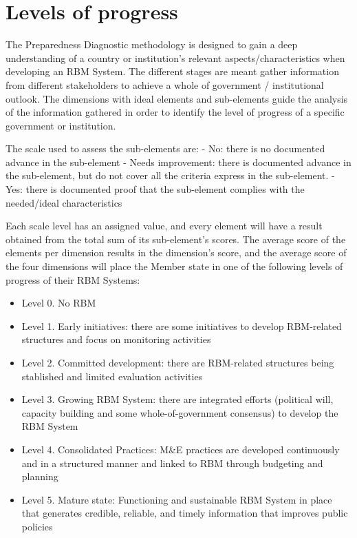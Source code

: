 \documentclass[
]{book}
\providecommand{\tightlist}{%
  \setlength{\itemsep}{0pt}\setlength{\parskip}{0pt}}
\begin{document}
\hypertarget{levels-of-progress}{%
\section{Levels of progress}\label{levels-of-progress}}

The Preparedness Diagnostic methodology is designed to gain a deep understanding of a country or institution's relevant aspects/characteristics when developing an RBM System. The different stages are meant gather information from different stakeholders to achieve a whole of government / institutional outlook. The dimensions with ideal elements and sub-elements guide the analysis of the information gathered in order to identify the level of progress of a specific government or institution.

The scale used to assess the sub-elements are:
- No: there is no documented advance in the sub-element
- Needs improvement: there is documented advance in the sub-element, but do not cover all the criteria express in the sub-element.
- Yes: there is documented proof that the sub-element complies with the needed/ideal characteristics

Each scale level has an assigned value, and every element will have a result obtained from the total sum of its sub-element's scores. The average score of the elements per dimension results in the dimension's score, and the average score of the four dimensions will place the Member state in one of the following levels of progress of their RBM Systems:

\begin{itemize}
\tightlist
\item
  Level 0. No RBM
\item
  Level 1. Early initiatives: there are some initiatives to develop RBM-related structures and focus on monitoring activities
\item
  Level 2. Committed development: there are RBM-related structures being stablished and limited evaluation activities
\item
  Level 3. Growing RBM System: there are integrated efforts (political will, capacity building and some whole-of-government consensus) to develop the RBM System
\item
  Level 4. Consolidated Practices: M\&E practices are developed continuously and in a structured manner and linked to RBM through budgeting and planning
\item
  Level 5. Mature state: Functioning and sustainable RBM System in place that generates credible, reliable, and timely information that improves public policies
\end{itemize}
\end{document}
